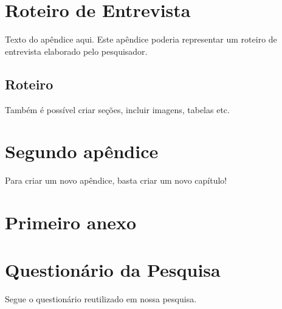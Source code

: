 \documentclass[
	12pt,				%
  openright,			%
	twoside,			%
	a4paper,			%
	english,			%
	french,				%
	spanish,			%
	brazil				%
	]{abntex2}
\begin{document}

% 
\begin{apendicesenv}

\partapendices

\chapter{Roteiro de Entrevista}\label{apendice:entrevista}

Texto do apêndice aqui. Este apêndice poderia representar um roteiro de
entrevista elaborado pelo pesquisador.

\lipsum[50]

\section{Roteiro}\label{roteiro}

Também é possível criar seções, incluir imagens, tabelas etc.

\lipsum[51]

\chapter{Segundo apêndice}\label{segundo-apuxeandice}

Para criar um novo apêndice, basta criar um novo capítulo!

\lipsum[55-57]

\end{apendicesenv}

\begin{anexosenv}
\partanexos
\chapter{Primeiro anexo}\label{anexo:questionario}

\lipsum[30]

\chapter{Questionário da Pesquisa}\label{anexo:questionario}

Segue o questionário reutilizado em nossa pesquisa.


\end{anexosenv}
\end{document}

